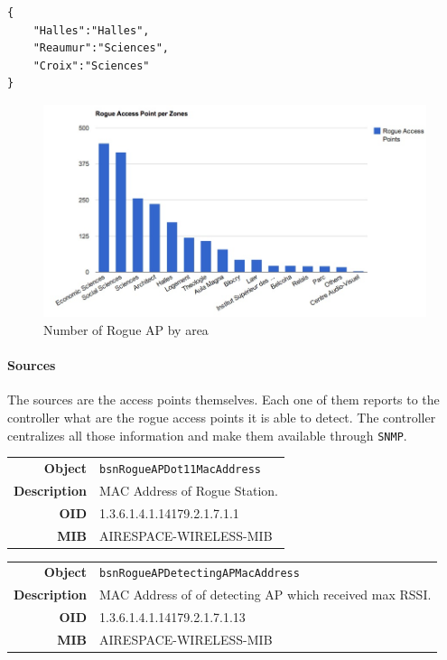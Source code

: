 \begin{lstlisting}[frame=single,breaklines=true,caption={Example of a Zone Dictionary}]
{
	"Halles":"Halles",
	"Reaumur":"Sciences",
	"Croix":"Sciences"	
}
\end{lstlisting}

\begin{figure}[H]
   \includegraphics[width=\textwidth]{Pictures/chapter5/rogue-ap.jpg}
   \caption{Number of Rogue AP by area}
\end{figure}

\paragraph*{Sources} The sources are the access points themselves. Each one of them reports to the controller what are the rogue access points it is able to detect. The controller centralizes all those information and make them available through \texttt{SNMP}.

\begin{tabular}{|r l|}
\hline
\textbf{Object} & \texttt{bsnRogueAPDot11MacAddress} \\
\textbf{Description} & \parbox{11cm}{MAC Address of Rogue Station.} \\
\textbf{OID} & 1.3.6.1.4.1.14179.2.1.7.1.1 \\
\textbf{MIB} & AIRESPACE-WIRELESS-MIB \\
\hline
\end{tabular}

\begin{tabular}{|r l|}
\hline
\textbf{Object} & \texttt{bsnRogueAPDetectingAPMacAddress} \\
\textbf{Description} & \parbox{11cm}{MAC Address of of detecting AP which received max RSSI.} \\
\textbf{OID} & 1.3.6.1.4.1.14179.2.1.7.1.13 \\
\textbf{MIB} & AIRESPACE-WIRELESS-MIB \\
\hline
\end{tabular}




